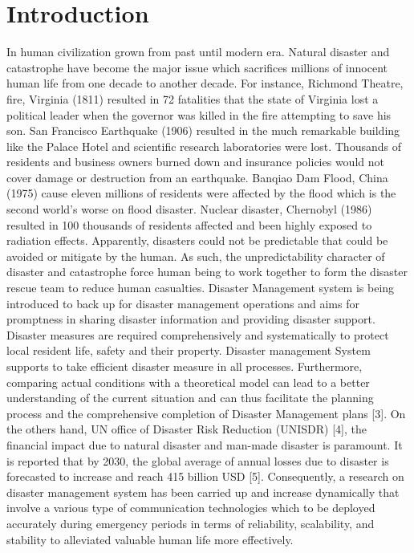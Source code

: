 \documentclass{article}
\begin{document}
\section{Introduction}
In human civilization grown from past until modern era. Natural disaster and catastrophe have become the major issue which sacrifices millions of innocent human life from one decade to another decade. For instance, Richmond Theatre, fire, Virginia (1811) resulted in 72 fatalities that the state of Virginia lost a political leader when the governor was killed in the fire attempting to save his son. San Francisco Earthquake (1906) resulted in the much remarkable building like the Palace Hotel and scientific research laboratories were lost. Thousands of residents and business owners burned down and insurance policies would not cover damage or destruction from an earthquake. Banqiao Dam Flood, China (1975) cause eleven millions of residents were affected by the flood which is the second world’s worse on flood disaster. Nuclear disaster, Chernobyl (1986) resulted in 100 thousands of residents affected and been highly exposed to radiation effects. Apparently, disasters could not be predictable that could be avoided or mitigate by the human. As such, the unpredictability character of disaster and catastrophe force human being to work together to form the disaster rescue team to reduce human casualties. Disaster Management system is being introduced to back up for disaster management operations and aims for promptness in sharing disaster information and providing disaster support. Disaster measures are required comprehensively and systematically to protect local resident life, safety and their property. Disaster management System supports to take efficient disaster measure in all processes. Furthermore, comparing actual conditions with a theoretical model can lead to a better understanding of the current situation and can thus facilitate the planning process and the comprehensive completion of Disaster Management plans [3].  On the others hand, UN office of Disaster Risk Reduction (UNISDR) [4], the financial impact due to natural disaster and man-made disaster is paramount. It is reported that by 2030, the global average of annual losses due to disaster is forecasted to increase and reach 415 billion USD [5]. Consequently, a research on disaster management system has been carried up and increase dynamically that involve a various type of communication technologies which to be deployed accurately during emergency periods in terms of reliability, scalability, and stability to alleviated valuable human life more effectively.
\end{document}
